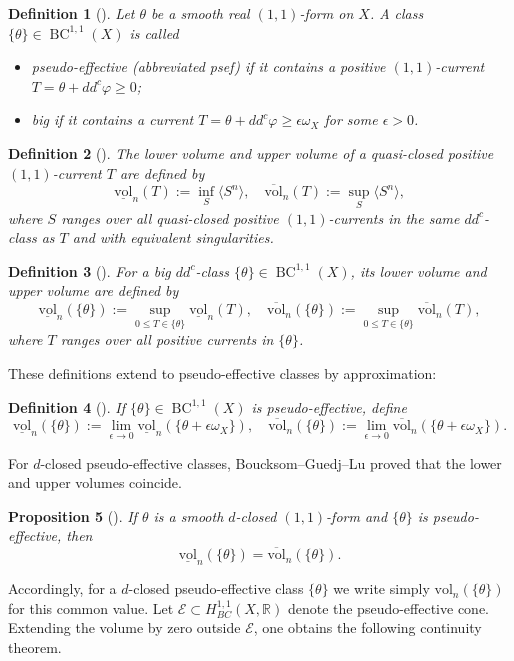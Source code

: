 \documentclass[11pt,letterpaper]{amsart}
\numberwithin{equation}{section}
\newcommand{\cal}{\mathcal}
\def\cE{{\cal E}}
\DeclareMathOperator{\BC}{BC}
\DeclareMathOperator{\vol}{vol}
\newtheorem{prop}{Proposition}[section]
\newtheorem{defi}[prop]{Definition}
\def\beq{\begin{equation}}
\def\eeq{\end{equation}}
\def\vol{\text{vol}}
\begin{document}
\begin{defi}[{\cite[Definition 1.14]{BGL}}]
Let $\theta$ be a smooth real $(1,1)$-form on $X$. A class $\{\theta\}\in\BC^{1,1}(X)$ is called
\begin{itemize}
\item \emph{pseudo-effective} (abbreviated psef) if it contains a positive $(1,1)$-current $T=\theta+dd^c\varphi\ge0$;
\item \emph{big} if it contains a current $T=\theta+dd^c\varphi\ge\epsilon\omega_X$ for some $\epsilon>0$.
\end{itemize}
\end{defi}


\begin{defi}[{\cite[Definition 3.1]{BGL}}]
The \emph{lower volume} and \emph{upper volume} of a quasi-closed positive $(1,1)$-current $T$ are defined by
\beq
\underline{\mathrm{vol}}_n(T):=\inf_{S}\langle S^n\rangle,\quad \overline{\mathrm{vol}}_n(T):=\sup_S \langle S^n\rangle,\nonumber
\eeq
where $S$ ranges over all quasi-closed positive $(1,1)$-currents in the same $dd^c$-class as $T$ and with equivalent singularities.
\end{defi}


\begin{defi}[{\cite[Definition 3.8]{BGL}}]\label{big-def}
For a big $dd^c$-class $\{\theta\}\in\BC^{1,1}(X)$, its \emph{lower volume} and \emph{upper volume} are defined by
 \beq
\underline{\mathrm{vol}}_n(\{\theta\}):=\sup_{0\le T\in \{\theta\}}\underline{\mathrm{vol}}_n(T),\quad \overline{\mathrm{vol}}_n(\{\theta\}):=\sup_{0\le T\in \{\theta\}}\overline{\mathrm{vol}}_n(T),\nonumber
\eeq
where $T$ ranges over all positive currents in $\{\theta\}$.
\end{defi}
These definitions extend to pseudo-effective classes by approximation:
\begin{defi}[{\cite[Definition 3.13]{BGL}}]
If $\{\theta\}\in\BC^{1,1}(X)$ is pseudo-effective, define
\beq
\underline{\mathrm{vol}}_n(\{\theta\}):=\lim_{\epsilon\to 0}\underline{\mathrm{vol}}_n(\{\theta+\epsilon\omega_X\}),\quad \overline{\mathrm{vol}}_n(\{\theta\}):=\lim_{\epsilon\to 0}\overline{\mathrm{vol}}_n(\{\theta+\epsilon\omega_X\}).\nonumber
\eeq
\end{defi}

For $d$-closed pseudo-effective classes, Boucksom--Guedj--Lu proved that the lower and upper volumes coincide.
\begin{prop}[{\cite[Proposition 3.16]{BGL}}]\label{equal}
If $\theta$ is a smooth $d$-closed $(1,1)$-form and $\{\theta\}$ is pseudo-effective, then
\beq
\underline{\mathrm{vol}}_n(\{\theta\})=\overline{\mathrm{vol}}_n(\{\theta\}).\nonumber
\eeq
\end{prop}
Accordingly, for a $d$-closed pseudo-effective class $\{\theta\}$ we write simply $\vol_n(\{\theta\})$ for this common value. Let $\cE\subset H^{1,1}_{BC}(X,\mathbb{R})$ denote the pseudo-effective cone. Extending the volume by zero outside $\cE$, one obtains the following continuity theorem.
\end{document}

